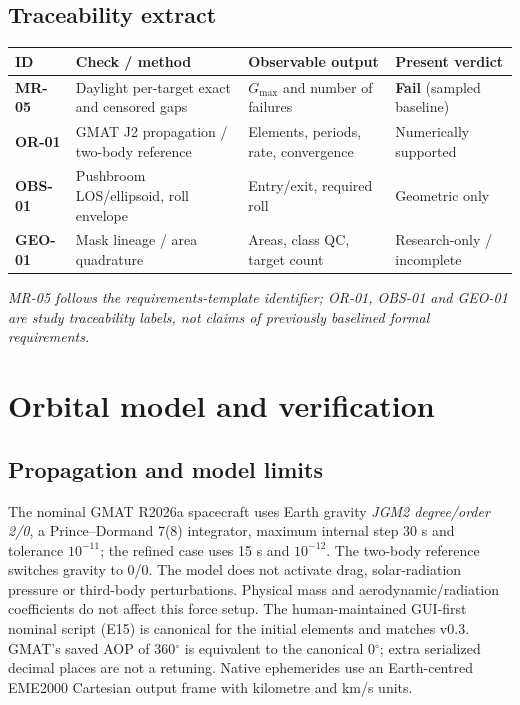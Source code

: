 \documentclass[10pt,a4paper]{article}
\newcommand{\shortcap}[1]{\par{\fontsize{8}{10}\selectfont\color{atlasgray}\textit{#1}}\par}
\newcommand{\req}[1]{\textbf{\textcolor{atlasblue}{#1}}}
\begin{document}
\subsection{Traceability extract}
{\fontsize{9}{12}\selectfont\par{}\begin{minipage}{\linewidth}\captionsetup{hypcap=false}\label{tab:requirements}\end{minipage}\par\nobreak
\begin{tabularx}{\linewidth}{@{}lXlX@{}}\toprule\rowcolor{headerbg}ID & Check / method & Observable output & Present verdict\\\midrule
\req{MR-05} & Daylight per-target exact and censored gaps & \(G_{\max}\) and number of failures & \textbf{Fail} (sampled baseline)\\
\rowcolor{rowalt}\req{OR-01} & GMAT J2 propagation / two-body reference & Elements, periods, rate, convergence & Numerically supported\\
\req{OBS-01} & Pushbroom LOS/ellipsoid, roll envelope & Entry/exit, required roll & Geometric only\\
\rowcolor{rowalt}\req{GEO-01} & Mask lineage / area quadrature & Areas, class QC, target count & Research-only / incomplete\\\bottomrule\end{tabularx}}
\shortcap{MR-05 follows the requirements-template identifier; OR-01, OBS-01 and GEO-01 are study traceability labels, not claims of previously baselined formal requirements.}

\section{Orbital model and verification}
\subsection{Propagation and model limits}
The nominal GMAT R2026a spacecraft uses Earth gravity \emph{JGM2 degree/order 2/0}, a Prince--Dormand 7(8) integrator, maximum internal step 30 s and tolerance \(10^{-11}\); the refined case uses 15 s and \(10^{-12}\). The two-body reference switches gravity to 0/0. The model does not activate drag, solar-radiation pressure or third-body perturbations. Physical mass and aerodynamic/radiation coefficients do not affect this force setup. The human-maintained GUI-first nominal script (E15) is canonical for the initial elements and matches v0.3. GMAT's saved AOP of 360$^\circ$ is equivalent to the canonical 0$^\circ$; extra serialized decimal places are not a retuning. Native ephemerides use an Earth-centred EME2000 Cartesian output frame with kilometre and km/s units.\par
\end{document}
